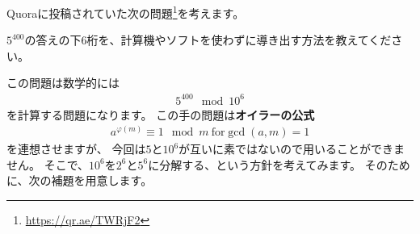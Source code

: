 \documentclass{jsarticle}
\begin{document}
Quoraに投稿されていた次の問題\footnote{\url{https://qr.ae/TWRjF2}}を考えます。
\begin{shaded}
\begin{center}
$5^{400}$の答えの下6桁を、計算機やソフトを使わずに導き出す方法を教えてください。
\end{center}
\end{shaded}
この問題は数学的には
\begin{align}
5^{400}\mod 10^{6}
\end{align}
を計算する問題になります。
この手の問題は\textbf{オイラーの公式}
\begin{align}
a^{\varphi(m)}\equiv 1\mod m\ \mathrm{for} \gcd(a,m)=1
\end{align}
を連想させますが、
今回は$5$と$10^6$が互いに素ではないので用いることができません。
そこで、$10^6$を$2^6$と$5^6$に分解する、という方針を考えてみます。
そのために、次の補題を用意します。
\end{document}
